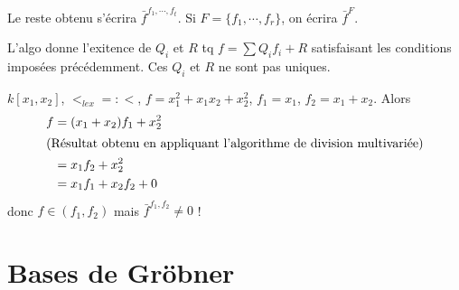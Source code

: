            \begin{nota}
                Le reste obtenu s'écrira $\bar f^{f_1, \cdots, f_t}$. Si $F = \{f_1, \cdots, f_r\}$, on écrira $\bar f^F$.
            \end{nota}
            \begin{remq}
                L'algo donne l'exitence de $Q_i$ et $R$ tq $f = \sum Q_if_i + R$ satisfaisant les conditions imposées précédemment. Ces $Q_i$ et $R$ ne sont pas uniques.
            \end{remq}
            \begin{expl}
                $k[x_1, x_2]$, $<_{lex} =: <$, $f = x_1^2 + x_1x_2 + x_2^2$, $f_1 = x_1$, $f_2 = x_1 + x_2$. Alors 
                \begin{align*}
                    f &= (x_1 + x_2)f_1 + x_2^2 \\
                    \intertext{(Résultat obtenu en appliquant l'algorithme de division multivariée)}
                    &= x_1f_2 + x_2^2 \\
                    &= x_1f_1 + x_2f_2 + 0 \\
                \end{align*}
                donc $f \in (f_1, f_2)$ mais $\bar f^{f_1, f_2} \neq 0$ !
            \end{expl}

    \section{Bases de Gröbner}
